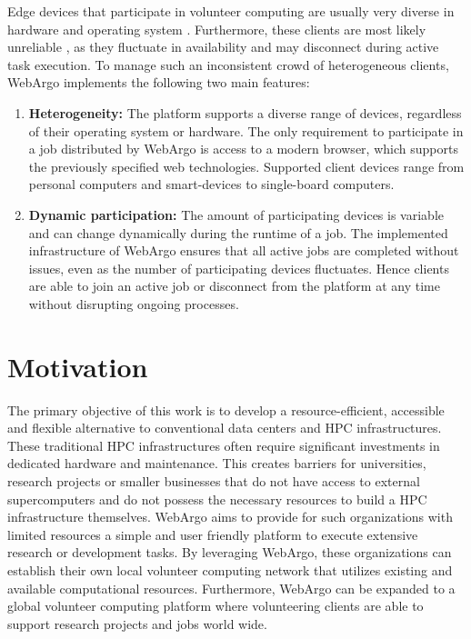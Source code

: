 Edge devices that participate in volunteer computing are usually very diverse in hardware and operating system \cite{intro:diverseDevices}. Furthermore, these clients are most likely unreliable \cite{relatedwork:boinc1}, as they fluctuate in availability and may disconnect during active task execution. To manage such an inconsistent crowd of heterogeneous clients, WebArgo implements the following two main features:
\begin{enumerate}
    \item \textbf{Heterogeneity:} The platform supports a diverse range of devices, regardless of their operating system or hardware. The only requirement to participate in a job distributed by WebArgo is access to a modern browser, which supports the previously specified web technologies. Supported client devices range from personal computers and smart-devices to single-board computers.
    \item \textbf{Dynamic participation:} The amount of participating devices is variable and can change dynamically during the runtime of a job. The implemented infrastructure of WebArgo ensures that all active jobs are completed without issues, even as the number of participating devices fluctuates. Hence clients are able to join an active job or disconnect from the platform at any time without disrupting ongoing processes.
\end{enumerate}

\section{Motivation}
\label{sec:intro:motivation}
The primary objective of this work is to develop a resource-efficient, accessible and flexible alternative to conventional data centers and \ac{HPC} infrastructures. These traditional \ac{HPC} infrastructures often require significant investments in dedicated hardware and maintenance. This creates barriers for universities, research projects or smaller businesses that do not have access to external supercomputers and do not possess the necessary resources to build a \ac{HPC} infrastructure themselves. WebArgo aims to provide for such organizations with limited resources a simple and user friendly platform to execute extensive research or development tasks. By leveraging WebArgo, these organizations can establish their own local volunteer computing network that utilizes existing and available computational resources. Furthermore, WebArgo can be expanded to a global volunteer computing platform where volunteering clients are able to support research projects and jobs world wide.

